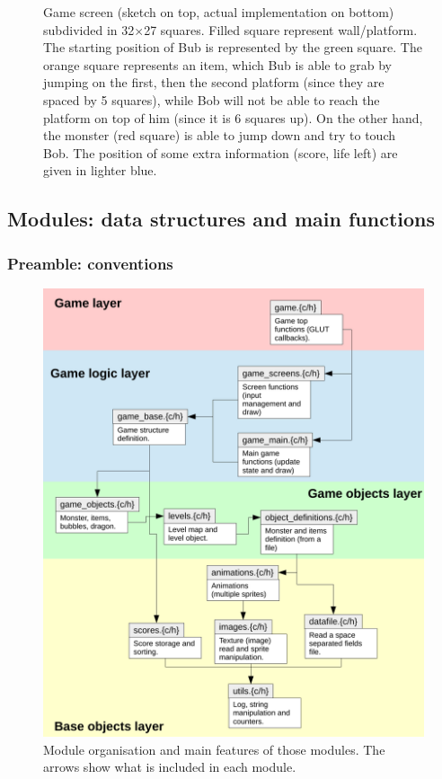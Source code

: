 \documentclass[12pt,a4paper]{article}
\begin{document}
\begin{figure}[!h]
	\caption{Game screen (sketch on top, actual implementation on bottom) subdivided in 32$\times$27 squares. Filled square represent wall/platform. The starting position of Bub is represented by the green square. The orange square represents an item, which Bub is able to grab by jumping on the first, then the second platform (since they are spaced by 5 squares), while Bob will not be able to reach the platform on top of him (since it is 6 squares up). On the other hand, the monster (red square) is able to jump down and try to touch Bob. The position of some extra information (score, life left) are given in lighter blue.}
	\label{fig:4:game}
\end{figure}


\subsection{Modules: data structures and main functions}

\subsubsection{Preamble: conventions}

\begin{figure}[!p]
\centering
\includegraphics[width=.8\linewidth]{i/files}
\caption{Module organisation and main features of those modules. The arrows show what is included in each module.}
\label{fig:modules}
\end{figure}
\end{document}

